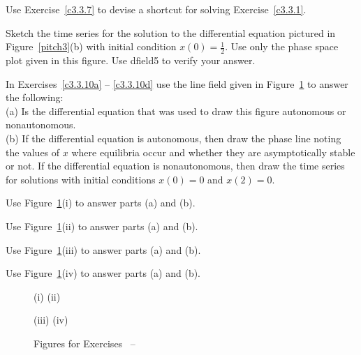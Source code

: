 \begin{exercise} \label{c3.3.9}
Use Exercise~\ref{c3.3.7} to devise a shortcut for solving
Exercise~\ref{c3.3.1}.
\end{exercise}

\begin{exercise} \label{c3.3.8}
Sketch the time series for the solution to the differential
equation pictured in Figure~\ref{pitch3}(b) with initial condition
$x(0)=\frac{1}{2}$.  Use only the phase space plot given in this
figure.  Use {\sf dfield5} to verify your answer.
\end{exercise}

\noindent In Exercises~\ref{c3.3.10a} -- \ref{c3.3.10d} use the line field 
given in Figure~\ref{F:exer3ad} to answer the following:\\
\noindent (a) Is the differential equation that was used to draw this figure 
autonomous or nonautonomous.\\
\noindent (b)  If the differential equation is autonomous, then draw the phase
line noting the values of $x$ where equilibria occur and whether they are 
asymptotically stable or not. If the differential equation is nonautonomous, 
then draw the time series for solutions with initial conditions $x(0)=0$ and 
$x(2)=0$.

\begin{exercise} \label{c3.3.10a}
Use Figure~\ref{F:exer3ad}(i) to answer parts (a) and (b).
\end{exercise}
\begin{exercise} \label{c3.3.10b}
Use Figure~\ref{F:exer3ad}(ii) to answer parts (a) and (b).
\end{exercise}
\begin{exercise} \label{c3.3.10c}
Use Figure~\ref{F:exer3ad}(iii) to answer parts (a) and (b).
\end{exercise}
\begin{exercise} \label{c3.3.10d}
Use Figure~\ref{F:exer3ad}(iv) to answer parts (a) and (b).
\end{exercise}

\begin{figure}[htb]
       \centerline{%
	}
\centerline{(i) \hspace{2.6in} (ii)}
       \centerline{%
	}
\centerline{(iii) \hspace{2.6in} (iv)}
       \caption{Figures for Exercises~\protect{\ref{c3.3.10a}} --
\protect{\ref{c3.3.10d}}}
       \label{F:exer3ad}
\end{figure}


